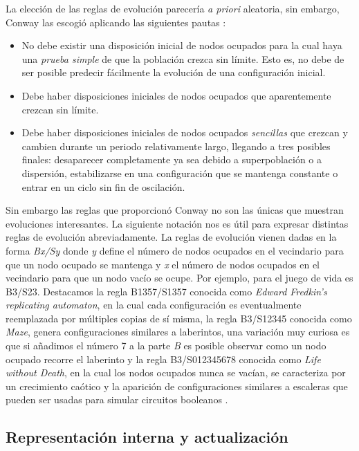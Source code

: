 \documentclass[../proyecto.tex]{memoir}
\begin{document}
La elección de las reglas de evolución parecería \textit{a priori} aleatoria, sin embargo, Conway las escogió aplicando las siguientes pautas \cite{libroGardner}:
\begin{itemize}
	\item No debe existir una disposición inicial de nodos ocupados para la cual haya una \textit{prueba simple} de que la población crezca sin límite. Esto es, no debe de ser posible predecir fácilmente la evolución de una configuración inicial.
	\item Debe haber disposiciones iniciales de nodos ocupados que aparentemente crezcan sin límite. 
	\item Debe haber disposiciones iniciales de nodos ocupados \textit{sencillas} que crezcan y cambien durante un periodo relativamente largo, llegando a tres posibles finales: desaparecer completamente ya sea debido a superpoblación o a dispersión, estabilizarse en una configuración que se mantenga constante o entrar en un ciclo sin fin de oscilación.
\end{itemize}

Sin embargo las reglas que proporcionó Conway no son las únicas que muestran evoluciones interesantes. La siguiente notación nos es útil para expresar distintas reglas de evolución abreviadamente. La reglas de evolución vienen dadas en la forma \textit{Bx/Sy} donde \textit{y} define el número de nodos ocupados en el vecindario para que un nodo ocupado se mantenga y \textit{x} el número de nodos ocupados en el vecindario para que un nodo vacío se ocupe. Por ejemplo, para el juego de vida es B3/S23. Destacamos la regla B1357/S1357 conocida como \textit{Edward Fredkin's replicating automaton}, en la cual cada configuración es eventualmente reemplazada por múltiples copias de sí misma, la regla B3/S12345 conocida como \textit{Maze}, genera configuraciones similares a laberintos, una variación muy curiosa es que si añadimos el número 7 a la parte \textit{B} es posible observar como un nodo ocupado recorre el laberinto y la regla B3/S012345678 conocida como \textit{Life without Death}, en la cual los nodos ocupados nunca se vacían, se caracteriza por un crecimiento caótico y la aparición de configuraciones similares a escaleras que pueden ser usadas para simular circuitos booleanos \cite{regla1}.


\subsection{Representación interna y actualización}
\end{document}
